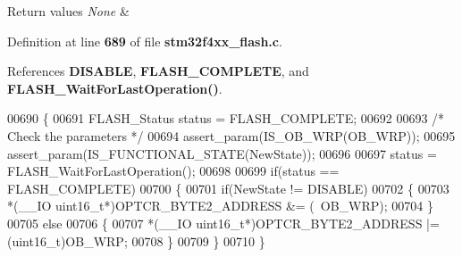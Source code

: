 \begin{DoxyRetVals}{Return values}
{\em None} & \\
\hline
\end{DoxyRetVals}


Definition at line \textbf{ 689} of file \textbf{ stm32f4xx\+\_\+flash.\+c}.



References \textbf{ D\+I\+S\+A\+B\+LE}, \textbf{ F\+L\+A\+S\+H\+\_\+\+C\+O\+M\+P\+L\+E\+TE}, and \textbf{ F\+L\+A\+S\+H\+\_\+\+Wait\+For\+Last\+Operation()}.


\begin{DoxyCode}
00690 \{ 
00691   FLASH_Status status = FLASH_COMPLETE;
00692   
00693   \textcolor{comment}{/* Check the parameters */}
00694   assert_param(IS_OB_WRP(OB\_WRP));
00695   assert_param(IS_FUNCTIONAL_STATE(NewState));
00696     
00697   status = FLASH_WaitForLastOperation();
00698 
00699   \textcolor{keywordflow}{if}(status == FLASH_COMPLETE)
00700   \{ 
00701     \textcolor{keywordflow}{if}(NewState != DISABLE)
00702     \{
00703       *(\_\_IO uint16\_t*)OPTCR_BYTE2_ADDRESS &= (~OB\_WRP);
00704     \}
00705     \textcolor{keywordflow}{else}
00706     \{
00707       *(\_\_IO uint16\_t*)OPTCR_BYTE2_ADDRESS |= (uint16\_t)OB\_WRP;
00708     \}
00709   \}
00710 \}
\end{DoxyCode}
